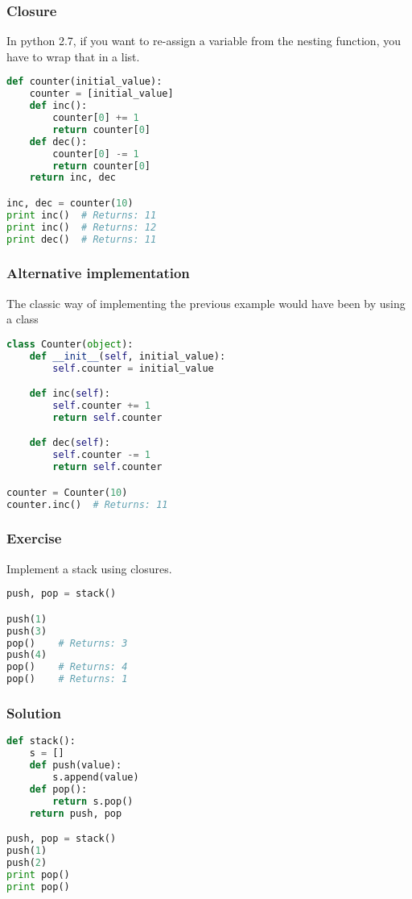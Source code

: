 \documentclass{beamer}
\begin{document}
\begin{frame}[fragile]
\frametitle{Closure}
In python 2.7, if you want to re-assign a variable from the nesting function,
you have to wrap that in a list.
\vspace{5 mm}
\begin{lstlisting}[language=python]
def counter(initial_value):
    counter = [initial_value]
    def inc():
        counter[0] += 1
        return counter[0]
    def dec():
        counter[0] -= 1
        return counter[0]
    return inc, dec

inc, dec = counter(10)
print inc()  # Returns: 11
print inc()  # Returns: 12
print dec()  # Returns: 11

\end{lstlisting}
\end{frame}


\begin{frame}[fragile]
\frametitle{Alternative implementation}
The classic way of implementing the previous example
would have been by using a class

\vspace{5 mm}
\begin{lstlisting}[language=python]
class Counter(object):
    def __init__(self, initial_value):
        self.counter = initial_value

    def inc(self):
        self.counter += 1
        return self.counter

    def dec(self):
        self.counter -= 1
        return self.counter

counter = Counter(10)
counter.inc()  # Returns: 11
\end{lstlisting}
\end{frame}

\begin{frame}[fragile]
\frametitle{Exercise}
Implement a stack using closures.
\vspace{5 mm}
\begin{lstlisting}[language=python]
push, pop = stack()

push(1)
push(3)
pop()    # Returns: 3
push(4)
pop()    # Returns: 4
pop()    # Returns: 1
\end{lstlisting}
\end{frame}


\begin{frame}[fragile]
\frametitle{Solution}
\vspace{5 mm}
\begin{lstlisting}[language=python]
def stack():
    s = []
    def push(value):
        s.append(value)
    def pop():
        return s.pop()
    return push, pop

push, pop = stack()
push(1)
push(2)
print pop()
print pop()

\end{lstlisting}
\end{frame}
\end{document}
